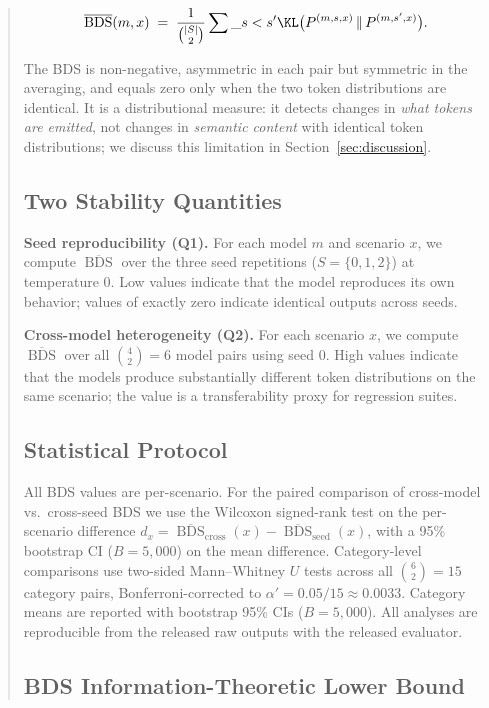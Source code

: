 \documentclass[11pt]{article}
\DeclareMathOperator{\BDS}{BDS}
\begin{document}
\begin{abstract}
\begin{equation}
  \overline{\BDS}(m, x) \;=\; \frac{1}{\binom{|S|}{2}} \sum\_{s < s'}
  \KL\bigl(P^{(m,s,x)} \,\|\, P^{(m,s',x)}\bigr).
\end{equation}

The BDS is non-negative, asymmetric in each pair but symmetric in the
averaging, and equals zero only when the two token distributions are
identical. It is a distributional measure: it detects changes in \emph{what
tokens are emitted}, not changes in \emph{semantic content} with identical
token distributions; we discuss this limitation in
Section~\ref{sec:discussion}.

\subsection{Two Stability Quantities}

\textbf{Seed reproducibility (Q1).} For each model $m$ and scenario $x$, we
compute $\overline{\BDS}$ over the three seed repetitions
($S = \{0,1,2\}$) at temperature 0. Low values indicate that the model
reproduces its own behavior; values of exactly zero indicate identical
outputs across seeds.

\textbf{Cross-model heterogeneity (Q2).} For each scenario $x$, we compute
$\overline{\BDS}$ over all $\binom{4}{2} = 6$ model pairs using seed 0.
High values indicate that the models produce substantially different token
distributions on the same scenario; the value is a transferability proxy
for regression suites.

\subsection{Statistical Protocol}

All BDS values are per-scenario. For the paired comparison of cross-model
vs.\ cross-seed BDS we use the Wilcoxon signed-rank test on the
per-scenario difference $d_x = \overline{\BDS}_{\text{cross}}(x) - \overline{\BDS}_{\text{seed}}(x)$,
with a 95\% bootstrap CI ($B = 5{,}000$) on the mean difference.
Category-level comparisons use two-sided Mann--Whitney $U$ tests across
all $\binom{6}{2} = 15$ category pairs, Bonferroni-corrected to
$\alpha' = 0.05/15 \approx 0.0033$. Category means are reported with
bootstrap 95\% CIs ($B = 5{,}000$). All analyses are reproducible from the
released raw outputs with the released evaluator.

\subsection{BDS Information-Theoretic Lower Bound}


\end{abstract}
\end{document}
